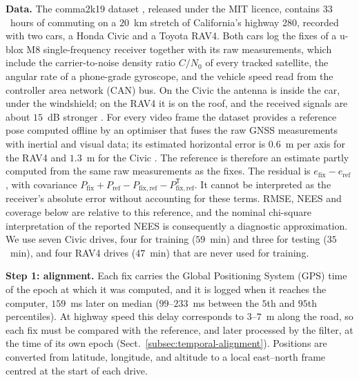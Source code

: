 \textbf{Data.} The comma2k19 dataset \cite{schafer2018_comma2k19}, released under the MIT licence, contains $33$~hours of commuting on a $20$~km stretch of California's highway 280, recorded with two cars, a Honda Civic and a Toyota RAV4. Both cars log the fixes of a u-blox M8 single-frequency receiver together with its raw measurements, which include the carrier-to-noise density ratio $C/N_0$ of every tracked satellite, the angular rate of a phone-grade gyroscope, and the vehicle speed read from the controller area network (CAN) bus. On the Civic the antenna is inside the car, under the windshield; on the RAV4 it is on the roof, and the received signals are about $15$~dB stronger \cite{schafer2018_comma2k19}. For every video frame the dataset provides a reference pose computed offline by an optimiser that fuses the raw GNSS measurements with inertial and visual data; its estimated horizontal error is $0.6$~m per axis for the RAV4 and $1.3$~m for the Civic \cite{schafer2018_comma2k19}. The reference is therefore an estimate partly computed from the same raw measurements as the fixes. The residual is $e_{\mathrm{fix}}-e_{\mathrm{ref}}$, with covariance $P_{\mathrm{fix}}+P_{\mathrm{ref}}-P_{\mathrm{fix,ref}}-P_{\mathrm{fix,ref}}^{\mathsf T}$. It cannot be interpreted as the receiver's absolute error without accounting for these terms. RMSE, NEES and coverage below are relative to this reference, and the nominal chi-square interpretation of the reported NEES is consequently a diagnostic approximation. We use seven Civic drives, four for training ($59$~min) and three for testing ($35$~min), and four RAV4 drives ($47$~min) that are never used for training.

\textbf{Step 1: alignment.} Each fix carries the Global Positioning System (GPS) time of the epoch at which it was computed, and it is logged when it reaches the computer, $159$~ms later on median ($99$--$233$~ms between the $5$th and $95$th percentiles). At highway speed this delay corresponds to $3$--$7$~m along the road, so each fix must be compared with the reference, and later processed by the filter, at the time of its own epoch (Sect.~\ref{subsec:temporal-alignment}). Positions are converted from latitude, longitude, and altitude to a local east--north frame centred at the start of each drive.

